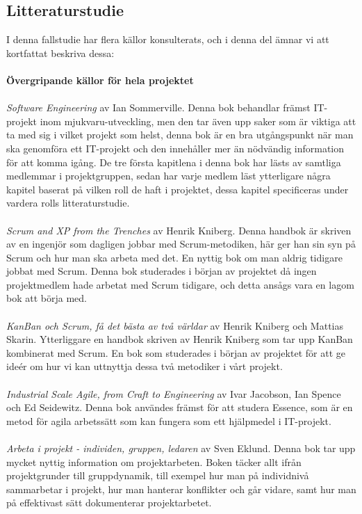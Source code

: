 \documentclass[conference]{IEEEtran}
\begin{document}
\subsection{Litteraturstudie}
I denna fallstudie har flera källor konsulterats, och i denna del ämnar vi att kortfattat beskriva dessa:\\
\\
\textbf{Övergripande källor för hela projektet}\\
\\
\textit{Software Engineering} av Ian Sommerville\cite{Sommerville10}. Denna bok behandlar främst IT-projekt inom mjukvaru-utveckling, men den tar även upp saker som är viktiga att ta med sig i vilket projekt som helst, denna bok är en bra utgångspunkt när man ska genomföra ett IT-projekt och den innehåller mer än nödvändig information för att komma igång. De tre första kapitlena i denna bok har lästs av samtliga medlemmar i projektgruppen, sedan har varje medlem läst ytterligare några kapitel baserat på vilken roll de haft i projektet, dessa kapitel specificeras under vardera rolls litteraturstudie.\\
\\
\textit{Scrum and XP from the Trenches} av Henrik Kniberg\cite{Kniberg07}. Denna handbok är skriven av en ingenjör som dagligen jobbar med Scrum-metodiken, här ger han sin syn på Scrum och hur man ska arbeta med det. En nyttig bok om man aldrig tidigare jobbat med Scrum. Denna bok studerades i början av projektet då ingen projektmedlem hade arbetat med Scrum tidigare, och detta ansågs vara en lagom bok att börja med.\\
\\
\textit{KanBan och Scrum, få det bästa av två världar} av Henrik Kniberg och Mattias Skarin\cite{Kniberg10}. Ytterliggare en handbok skriven av Henrik Kniberg som tar upp KanBan kombinerat med Scrum. En bok som studerades i början av projektet för att ge ideér om hur vi kan uttnyttja dessa två metodiker i vårt projekt.\\
\\
\textit{Industrial Scale Agile, from Craft to Engineering} av Ivar Jacobson, Ian Spence och Ed Seidewitz\cite{Jacobson16}. Denna bok användes främst för att studera Essence, som är en metod för agila arbetssätt som kan fungera som ett hjälpmedel i IT-projekt.\\
\\
\textit{Arbeta i projekt - individen, gruppen, ledaren} av Sven Eklund\cite{Eklund14}. Denna bok tar upp mycket nyttig information om projektarbeten. Boken täcker allt ifrån projektgrunder till gruppdynamik, till exempel hur man på individnivå sammarbetar i projekt, hur man hanterar konflikter och går vidare, samt hur man på effektivast sätt dokumenterar projektarbetet.\\
\end{document}
